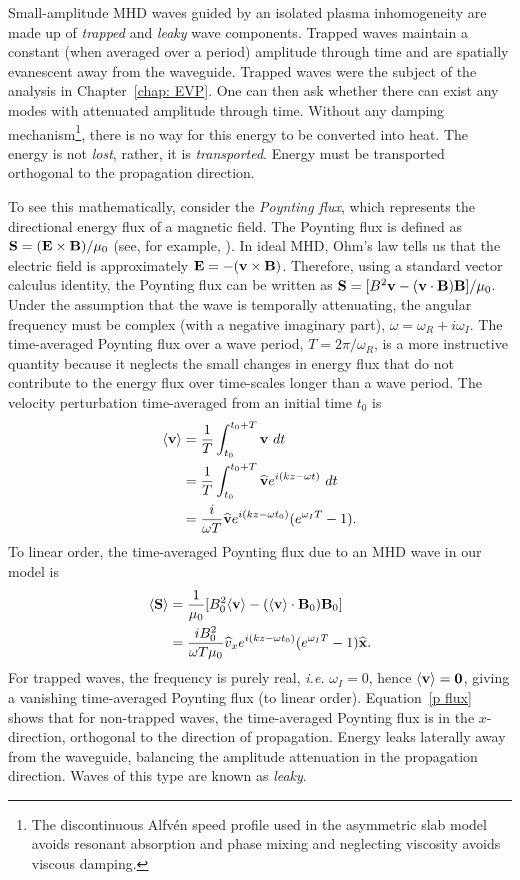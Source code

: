 Small-amplitude MHD waves guided by an isolated plasma inhomogeneity are made up of \textit{trapped} and \textit{leaky} wave components. Trapped waves maintain a constant (when averaged over a period) amplitude through time and are spatially evanescent away from the waveguide. Trapped waves were the subject of the analysis in Chapter~\ref{chap: EVP}. One can then ask whether there can exist any modes with attenuated amplitude through time. Without any damping mechanism\footnote{The discontinuous Alfv\'{e}n speed profile used in the asymmetric slab model avoids resonant absorption and phase mixing and neglecting viscosity avoids viscous damping.}, there is no way for this energy to be converted into heat. The energy is not \textit{lost}, rather, it is \textit{transported}. Energy must be transported orthogonal to the propagation direction.

To see this mathematically, consider the \textit{Poynting flux}, which represents the directional energy flux of a magnetic field. The Poynting flux is defined as $\mathbf{S} = (\mathbf{E} \times \mathbf{B})/\mu_0$ (see, for example, \citealp{pri14}). In ideal MHD, Ohm's law tells us that the electric field is approximately $\mathbf{E} = -(\mathbf{v} \times \mathbf{B})$. Therefore, using a standard vector calculus identity, the Poynting flux can be written as $\mathbf{S} = [B^2\mathbf{v} - (\mathbf{v} \cdot \mathbf{B})\mathbf{B}] / \mu_0$. Under the assumption that the wave is temporally attenuating, the angular frequency must be complex (with a negative imaginary part), $\omega = \omega_R + i\omega_I$. The time-averaged Poynting flux over a wave period, $T = 2\pi/\omega_R$, is a more instructive quantity because it neglects the small changes in energy flux that do not contribute to the energy flux over time-scales longer than a wave period. The velocity perturbation time-averaged from an initial time $t_0$ is
\begin{align}
	\langle \mathbf{v} \rangle &= \frac{1}{T} \int_{t_0}^{t_0 + T} \mathbf{v} ~dt \\
	&= \frac{1}{T} \int_{t_0}^{t_0 + T} \mathbf{\widehat{v}} e^{i(kz - \omega t)} ~dt \\
	&= \frac{i}{\omega T} \mathbf{\widehat{v}} e^{i(kz - \omega t_0)} (e^{\omega_I T} - 1).
\end{align}
To linear order, the time-averaged Poynting flux due to an MHD wave in our model is
\begin{align}
\langle \mathbf{S} \rangle &= \frac{1}{\mu_0}[B_0^2\langle\mathbf{v}\rangle - (\langle\mathbf{v}\rangle \cdot \mathbf{B}_0)\mathbf{B}_0] \\
&= \frac{iB_0^2}{\omega T \mu_0} \widehat{v}_x e^{i(kz - \omega t_0)} (e^{\omega_I T} - 1) \mathbf{\widehat{x}}.
\label{p flux}
\end{align}
For trapped waves, the frequency is purely real, \textit{i.e.} $\omega_I = 0$, hence $\langle \mathbf{v} \rangle = \mathbf{0}$, giving a vanishing time-averaged Poynting flux (to linear order). Equation~\eqref{p flux} shows that for non-trapped waves, the time-averaged Poynting flux is in the $x$-direction, orthogonal to the direction of propagation. Energy leaks laterally away from the waveguide, balancing the amplitude attenuation in the propagation direction. Waves of this type are known as \textit{leaky}.

